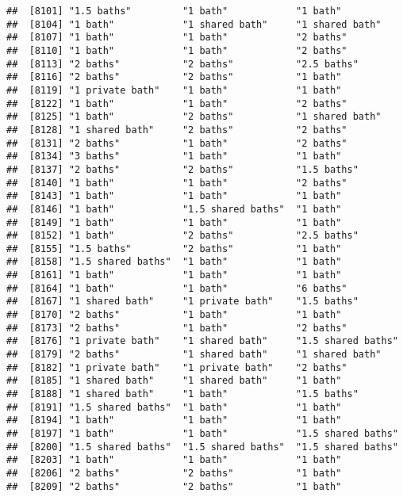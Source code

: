 \documentclass[
]{article}
\begin{document}
\begin{verbatim}
##  [8101] "1.5 baths"         "1 bath"            "1 bath"           
##  [8104] "1 bath"            "1 shared bath"     "1 shared bath"    
##  [8107] "1 bath"            "1 bath"            "2 baths"          
##  [8110] "1 bath"            "1 bath"            "2 baths"          
##  [8113] "2 baths"           "2 baths"           "2.5 baths"        
##  [8116] "2 baths"           "2 baths"           "1 bath"           
##  [8119] "1 private bath"    "1 bath"            "1 bath"           
##  [8122] "1 bath"            "1 bath"            "2 baths"          
##  [8125] "1 bath"            "2 baths"           "1 shared bath"    
##  [8128] "1 shared bath"     "2 baths"           "2 baths"          
##  [8131] "2 baths"           "1 bath"            "2 baths"          
##  [8134] "3 baths"           "1 bath"            "1 bath"           
##  [8137] "2 baths"           "2 baths"           "1.5 baths"        
##  [8140] "1 bath"            "1 bath"            "2 baths"          
##  [8143] "1 bath"            "1 bath"            "1 bath"           
##  [8146] "1 bath"            "1.5 shared baths"  "1 bath"           
##  [8149] "1 bath"            "1 bath"            "1 bath"           
##  [8152] "1 bath"            "2 baths"           "2.5 baths"        
##  [8155] "1.5 baths"         "2 baths"           "1 bath"           
##  [8158] "1.5 shared baths"  "1 bath"            "1 bath"           
##  [8161] "1 bath"            "1 bath"            "1 bath"           
##  [8164] "1 bath"            "1 bath"            "6 baths"          
##  [8167] "1 shared bath"     "1 private bath"    "1.5 baths"        
##  [8170] "2 baths"           "1 bath"            "1 bath"           
##  [8173] "2 baths"           "1 bath"            "2 baths"          
##  [8176] "1 private bath"    "1 shared bath"     "1.5 shared baths" 
##  [8179] "2 baths"           "1 shared bath"     "1 shared bath"    
##  [8182] "1 private bath"    "1 private bath"    "2 baths"          
##  [8185] "1 shared bath"     "1 shared bath"     "1 bath"           
##  [8188] "1 shared bath"     "1 bath"            "1.5 baths"        
##  [8191] "1.5 shared baths"  "1 bath"            "1 bath"           
##  [8194] "1 bath"            "1 bath"            "1 bath"           
##  [8197] "1 bath"            "1 bath"            "1.5 shared baths" 
##  [8200] "1.5 shared baths"  "1.5 shared baths"  "1.5 shared baths" 
##  [8203] "1 bath"            "1 bath"            "1 bath"           
##  [8206] "2 baths"           "2 baths"           "1 bath"           
##  [8209] "2 baths"           "2 baths"           "1 bath"           

\end{verbatim}
\end{document}
